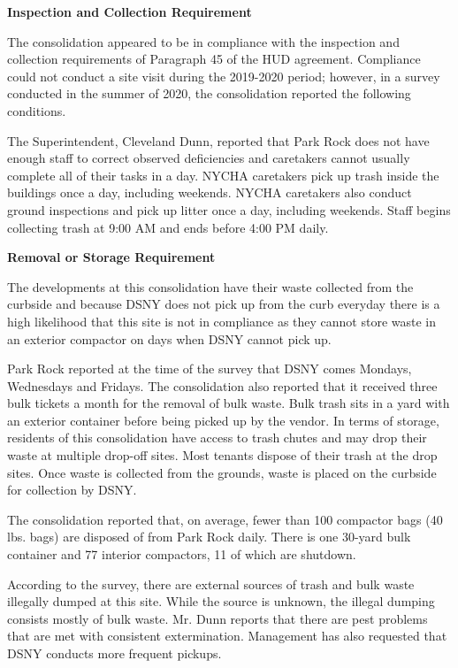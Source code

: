 

\textbf{Inspection and Collection Requirement}

The consolidation appeared to be in compliance with the inspection and collection requirements of Paragraph 45 of the HUD agreement. Compliance could not conduct a site visit during the 2019-2020 period; however, in a survey conducted in the summer of 2020, the consolidation reported the following conditions.

The Superintendent, Cleveland Dunn, reported that Park Rock does not have enough staff to correct observed deficiencies and caretakers cannot usually complete all of their tasks in a day. NYCHA caretakers pick up trash inside the buildings once a day, including weekends. NYCHA caretakers also conduct ground inspections and pick up litter once a day, including weekends. Staff begins collecting trash at 9:00 AM and ends before 4:00 PM daily. 

\textbf{Removal or Storage Requirement}

The developments at this consolidation have their waste collected from the curbside and because DSNY does not pick up from the curb everyday there is a high likelihood that this site is not in compliance as they cannot store waste in an exterior compactor on days when DSNY cannot pick up.

Park Rock reported at the time of the survey that DSNY comes Mondays, Wednesdays and Fridays. The consolidation also reported that it received three bulk tickets a month for the removal of bulk waste. Bulk trash sits in a yard with an exterior container before being picked up by the vendor. In terms of storage, residents of this consolidation have access to trash chutes and may drop their waste at multiple drop-off sites. Most tenants dispose of their trash at the drop sites. Once waste is collected from the grounds, waste is placed on the curbside for collection by DSNY. 

The consolidation reported that, on average, fewer than 100 compactor bags (40 lbs. bags) are disposed of from Park Rock daily. There is one 30-yard bulk container and 77 interior compactors, 11 of which are shutdown.

According to the survey, there are external sources of trash and bulk waste illegally dumped at this site. While the source is unknown, the illegal dumping consists mostly of bulk waste. Mr. Dunn reports that there are pest problems that are met with consistent extermination. Management has also requested that DSNY conducts more frequent pickups. 
